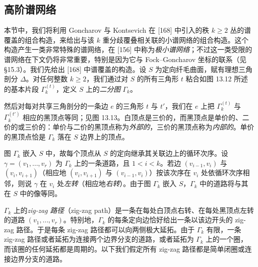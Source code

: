 
\subsection{高阶谱网络}

本节中，我们将利用 Goncharov 与 Kontsevich 在 [168] 中引入的秩 $k\ge2$ 丛的谱覆盖的组合构造，来给出与该 $k$ 重分歧覆叠相关联的小谱网络的组合构造。这个构造产生一类非常特殊的谱网络，在 [156] 中称为\emph{极小谱网络}；不过这一类受限的谱网络在下文仍将非常重要，特别是因为它与 Fock--Goncharov 坐标的联系（见 §15.3）。我们先给出 [168] 中谱覆盖的构造。设 $S$ 为定向纤毛曲面，赋有理想三角剖分 $\Delta$。对任何整数 $k\ge2$，我们通过对 $S$ 的所有三角形 $t$ 粘合如图 13.12 所述的基本片段 $\Gamma_k^{(t)}$，定义 $S$ 上的\emph{二分图} $\Gamma_k$。


然后对每对共享三角剖分的一条边 $e$ 的三角形 $t$ 与 $t'$，我们在 $e$ 上把 $\Gamma_k^{(t)}$ 与 $\Gamma_k^{(t')}$ 相应的黑顶点等同；见图 13.13。白顶点是三价的，而黑顶点是单价的、二价的或三价的：单价与二价的黑顶点称为\emph{外部的}，三价的黑顶点称为\emph{内部的}。单价的黑顶点恰是 $\Gamma_k$ 落在 $S$ 边界上的顶点。


图 $\Gamma_k$ 嵌入 $S$ 中，故每个顶点从 $S$ 的定向继承其关联边上的循环次序。设 $\gamma=(v_1,\dots,v_r)$ 为
$\Gamma_k$ 上的一条道路，且 $1<i<k$。若边 $(v_{i-1},v_i)$ 与 $(v_i,v_{i+1})$（相应地 $(v_i,v_{i+1})$ 与 $(v_{i-1},v_i)$）按该次序在 $v_i$ 处依循环次序相邻，则说 $\gamma$ 在 $v_i$ 处\emph{左转}（相应地\emph{右转}）。由于图 $\Gamma_k$ 嵌入 $S$，$\Gamma_k$ 中的道路将与其在 $S$ 中的像等同。

$\Gamma_k$ 上的\emph{zig-zag 路径}（zig-zag path）是一条在每处白顶点右转、在每处黑顶点左转的道路 $(v_1,\dots,v_r)$。特别地，$\Gamma_k$ 的每条定向边恰好给出一条以该边开头的 zig-zag 路径。于是每条 zig-zag 路径都可以向两侧极大延拓。由于 $\Gamma_k$ 有限，一条 zig-zag 路径或者延拓为连接两个边界分支的道路，或者延拓为 $\Gamma_k$ 上的一个圈，而该圈的任何延拓都是周期的。以下我们假定所有 zig-zag 路径都是简单闭圈或连接边界分支的道路。

